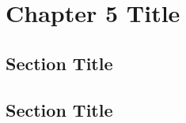 \documentclass[../main.tex]{subfiles}
\begin{document}
\newpage
\doublespacing
\setcounter{chapter}{4}
\thesischapterstyle
\thispagestyle{empty}

\chapter{Chapter 5 Title}\label{chap5:short-label}

\section{Section Title}
\lipsum[1]

\section{Section Title}
\lipsum[2]
\end{document}
